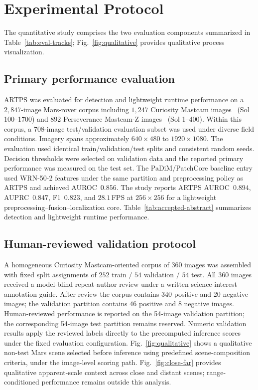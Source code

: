 \section{Experimental Protocol}
\label{sec:protocol}
The quantitative study comprises the two evaluation components summarized in
Table~\ref{tab:eval-tracks}; Fig.~\ref{fig:qualitative} provides qualitative process
visualization.

\subsection{Primary performance evaluation}
ARTPS was evaluated for detection and lightweight runtime performance on a $2{,}847$-image
Mars-rover corpus including $1{,}247$ Curiosity Mastcam images~\citep{malin2017mastcam}
(Sol 100--1700) and
$892$ Perseverance Mastcam-Z images~\citep{bell2021mastcamz} (Sol 1--400).
Within this corpus, a $708$-image test/validation evaluation subset was used under diverse
field conditions.
Imagery spans approximately $640\times480$ to $1920\times1080$.
The evaluation used identical train/validation/test splits and consistent random seeds.
Decision thresholds were selected on validation data and the reported primary performance
was measured on the test set.
The PaDiM/PatchCore baseline entry used WRN-50-2 features under the same partition and
preprocessing policy as ARTPS and achieved AUROC~$0.856$.
The study reports ARTPS AUROC~$0.894$, AUPRC~$0.847$, F1~$0.823$, and $28.1$\,FPS at
$256\times256$ for a lightweight preprocessing--fusion--localization core.
Table~\ref{tab:accepted-abstract} summarizes detection and lightweight runtime performance.

\subsection{Human-reviewed validation protocol}
A homogeneous Curiosity Mastcam-oriented corpus of $360$ images was assembled with fixed split
assignments of $252$ train / $54$ validation / $54$ test.
All $360$ images received a model-blind repeat-author review under a written science-interest
annotation guide.
After review the corpus contains $340$ positive and $20$ negative images; the validation
partition contains $46$ positive and $8$ negative images.
Human-reviewed performance is reported on the 54-image validation partition; the corresponding
54-image test partition remains reserved.
Numeric validation results apply the reviewed labels directly to the precomputed inference
scores under the fixed evaluation configuration.
Fig.~\ref{fig:qualitative} shows a qualitative non-test Mars scene selected before inference
using predefined scene-composition criteria, under the image-level scoring path.
Fig.~\ref{fig:close-far} provides qualitative apparent-scale context across close and distant
scenes; range-conditioned performance remains outside this analysis.

